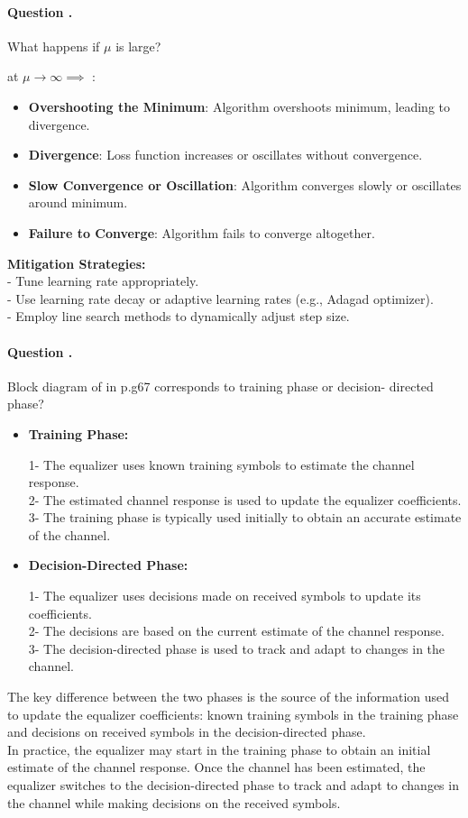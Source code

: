 \documentclass[14pt,a4paper]{report}
\newcounter{question}
\newcommand*\question{%
\stepcounter{question}%
\paragraph{Question \thesection.\thequestion}}
\begin{document}
\question
{
    What happens if $\mu$ is large?
}
\begin{answer_box*}
    at $\mu {\rightarrow}\infty \implies$ :
\begin{itemize}
    \item \textbf{Overshooting the Minimum}:  Algorithm overshoots minimum, leading to divergence.
    
    \item \textbf{Divergence}: Loss function increases or oscillates without convergence.
        
    \item \textbf{Slow Convergence or Oscillation}: Algorithm converges slowly or oscillates around minimum.
        
    \item \textbf{Failure to Converge}:  Algorithm fails to converge altogether.
        
\end{itemize}
    \textbf{Mitigation Strategies:}\\
    - Tune learning rate appropriately.\\
    - Use learning rate decay or adaptive learning rates (e.g., Adagad optimizer).\\
    - Employ line search methods to dynamically adjust step size.
\end{answer_box*}
\question
{
    Block diagram of in p.g67 corresponds to training phase or decision- directed phase?
}
\begin{answer_box*}
\begin{itemize}
    \item \textbf {Training Phase:}
    
    1- The equalizer uses known training symbols to estimate the channel response.\\
    2- The estimated channel response is used to update the equalizer coefficients.\\
    3- The training phase is typically used initially to obtain an accurate estimate of the channel.
    
    \item \textbf {Decision-Directed Phase:}
    
    1- The equalizer uses decisions made on received symbols to update its coefficients.\\
    2- The decisions are based on the current estimate of the channel response.\\
    3- The decision-directed phase is used to track and adapt to changes in the channel.   
\end{itemize}


The key difference between the two phases is the source of the information used to update the equalizer coefficients: known training symbols in the training phase and decisions on received symbols in the decision-directed phase.\\
In practice, the equalizer may start in the training phase to obtain an initial estimate of the channel response. Once the channel has been estimated, the equalizer switches to the decision-directed phase to track and adapt to changes in the channel while making decisions on the received symbols.
\end{answer_box*}
\end{document}
